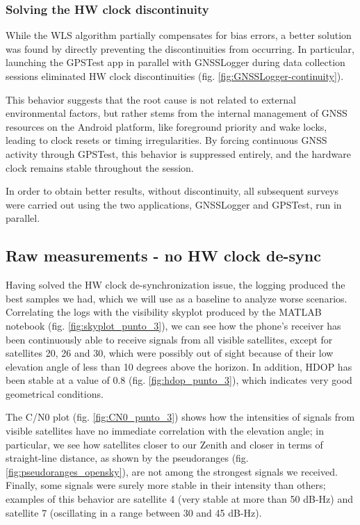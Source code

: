 \subsubsection{Solving the HW clock discontinuity}
 
While the WLS algorithm partially compensates for bias errors, a better solution was found by directly preventing the discontinuities from occurring.
In particular, launching the GPSTest \cite{gpsTestApp} app in parallel with GNSSLogger during data collection sessions eliminated HW clock discontinuities (fig. \ref{fig:GNSSLogger-continuity}). 

This behavior suggests that the root cause is not related to external environmental factors, but rather stems from the internal management of GNSS resources on the Android platform, like foreground priority and wake locks, leading to clock resets or timing irregularities.
By forcing continuous GNSS activity through GPSTest, this behavior is suppressed entirely, and the hardware clock remains stable throughout the session.

In order to obtain better results, without discontinuity, all subsequent surveys were carried out using the two applications, GNSSLogger and GPSTest, run in parallel.


\subsection{Raw measurements - no HW clock de-sync}
Having solved the HW clock de-synchronization issue, the logging produced the best samples we had, which we will use as a baseline to analyze worse scenarios. Correlating the logs with the visibility skyplot produced by the MATLAB notebook \cite{skyplotsNotebook} (fig. \ref{fig:skyplot_punto_3}), we can see how the phone's receiver has been continuously able to receive signals from all visible satellites, except for satellites 20, 26 and 30, which were possibly out of sight because of their low elevation angle of less than 10 degrees above the horizon. In addition, HDOP has been stable at a value of 0.8 (fig. \ref{fig:hdop_punto_3}), which indicates very good geometrical conditions.

The C/N0 plot (fig. \ref{fig:CN0_punto_3}) shows how the intensities of signals from visible satellites have no immediate correlation with the elevation angle; in particular, we see how satellites closer to our Zenith and closer in terms of straight-line distance, as shown by the pseudoranges (fig. \ref{fig:pseudoranges_opensky}), are not among the strongest signals we received. Finally, some signals were surely more stable in their intensity than others; examples of this behavior are satellite 4 (very stable at more than 50 dB-Hz) and satellite 7 (oscillating in a range between 30 and 45 dB-Hz).

